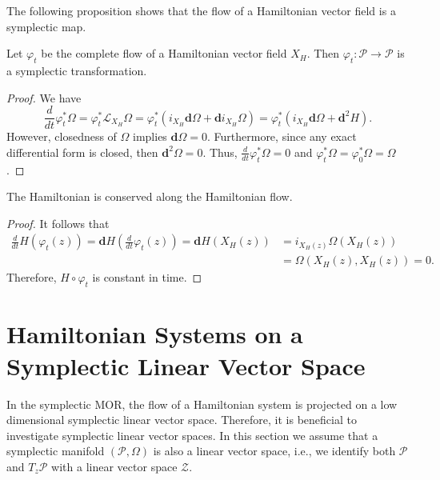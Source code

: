 The following proposition shows that the flow of a Hamiltonian vector field is a symplectic map.
\begin{proposition} \label{theorem:2.9}
Let $\varphi_t$ be the complete flow of a Hamiltonian vector field $X_H$. Then $\varphi_t:\mathcal P \to \mathcal P$ is a symplectic transformation.
\end{proposition}
\begin{proof}
We have
\begin{equation*}
	\frac{d}{dt} \varphi_t^* \Omega = \varphi_t^* \mathcal L_{X_H} \Omega = \varphi_t^*( i_{X_H} \mathbf d \Omega + \mathbf d i_{X_H} \Omega ) =  \varphi_t^*( i_{X_H} \mathbf d \Omega + \mathbf d^2 H ).
\end{equation*}
However, closedness of $\Omega$ implies $\mathbf d \Omega = 0$. Furthermore, since any exact differential form is closed, then $\mathbf d^2 \Omega = 0$. Thus, $\frac{d}{dt} \varphi_t^* \Omega = 0$ and $\varphi_t^* \Omega = \varphi_0^* \Omega = \Omega$.
\end{proof}
\begin{corollary} \label{theorem:2.10}
The Hamiltonian is conserved along the Hamiltonian flow.
\end{corollary}
\begin{proof}
It follows that
\begin{equation*}
\begin{aligned}
	\frac{d}{dt} H(\varphi_t(z)) = \mathbf dH\left( \frac{d}{dt} \varphi_t(z) \right) = \mathbf dH \left( X_H(z) \right) &= i_{X_H(z)} \Omega(X_H(z))\\
	& = \Omega(X_H(z),X_H(z)) = 0.
\end{aligned}
\end{equation*}
Therefore, $H\circ \varphi_t$ is constant in time.
\end{proof}

\section{Hamiltonian Systems on a Symplectic Linear Vector Space} \label{section:2.4}
In the symplectic MOR, the flow of a Hamiltonian system is projected on a low dimensional symplectic linear vector space. Therefore, it is beneficial to investigate symplectic linear vector spaces. In this section we assume that a symplectic manifold $(\mathcal P, \Omega)$ is also a linear vector space, i.e., we identify both $\mathcal P$ and $T_z \mathcal P$ with a linear vector space $\mathcal Z$.

